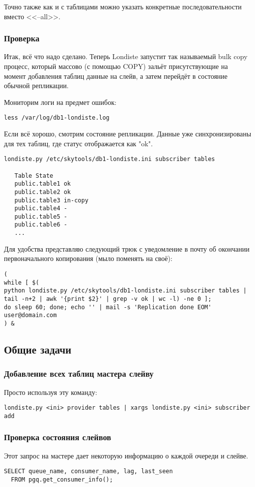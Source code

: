 Точно также как и с таблицами можно указать конкретные последовательности вместо <<--all>>.

\subsubsection{Проверка}
Итак, всё что надо сделано. Теперь Londiste запустит так называемый bulk copy
процесс, который массово (с помощью COPY) зальёт присутствующие на момент
добавления таблиц данные на слейв, а затем перейдёт в состояние обычной репликации.

Мониторим логи на предмет ошибок:
\begin{verbatim}
less /var/log/db1-londiste.log
\end{verbatim}

Если всё хорошо, смотрим состояние репликации. Данные уже синхронизированы для
тех таблиц, где статус отображается как "ok".
\begin{verbatim}
londiste.py /etc/skytools/db1-londiste.ini subscriber tables

   Table State
   public.table1 ok
   public.table2 ok
   public.table3 in-copy
   public.table4 -
   public.table5 -
   public.table6 -
   ...
\end{verbatim}

Для удобства представляю следующий трюк с уведомление в почту об окончании
первоначального копирования (мыло поменять на своё):
\begin{verbatim}
(
while [ $(
python londiste.py /etc/skytools/db1-londiste.ini subscriber tables |
tail -n+2 | awk '{print $2}' | grep -v ok | wc -l) -ne 0 ];
do sleep 60; done; echo '' | mail -s 'Replication done EOM' user@domain.com
) &
\end{verbatim}


\subsection{Общие задачи}

\subsubsection{Добавление всех таблиц мастера слейву}
Просто используя эту команду:
\begin{verbatim}
londiste.py <ini> provider tables | xargs londiste.py <ini> subscriber add
\end{verbatim}

\subsubsection{Проверка состояния слейвов}
Этот запрос на мастере дает некоторую информацию о каждой очереди и слейве.
\begin{verbatim}
SELECT queue_name, consumer_name, lag, last_seen
  FROM pgq.get_consumer_info();
\end{verbatim}

